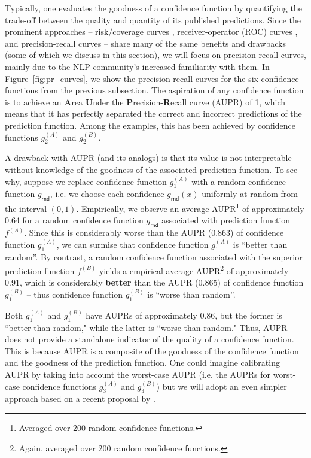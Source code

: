 \documentclass[11pt]{article}
\begin{document}
Typically, one evaluates the goodness of a confidence function by quantifying the trade-off between the quality and quantity of its published predictions. Since the prominent approaches -- risk/coverage curves \cite{el2010foundations}, receiver-operator (ROC) curves \cite{Davis06}, and precision-recall curves \cite{HendrycksG17} -- share many of the same benefits and drawbacks (some of which we discuss in this section), we will focus on precision-recall curves, mainly due to the NLP community's increased familiarity with them. In Figure~\ref{fig:pr_curves}, we show the precision-recall curves for the six confidence functions from the previous subsection. The aspiration of any confidence function is to achieve an \textbf{A}rea \textbf{U}nder the \textbf{P}recision-\textbf{R}ecall curve (AUPR) of 1, which means that it has perfectly separated the correct and incorrect predictions of the prediction function. Among the examples, this has been achieved by confidence functions $g_2^{(A)}$ and $g_2^{(B)}$.

A drawback with AUPR (and its analogs) is that its value is not interpretable without knowledge of the goodness of the associated prediction function. To see why, suppose we replace confidence function $g_1^{(A)}$ with a random confidence function $g_\mathsf{rnd}$, i.e. we choose each confidence $g_\mathsf{rnd}(x)$ uniformly at random from the interval $(0,1)$. Empirically, we observe an average AUPR\footnote{Averaged over 200 random confidence functions.} of approximately 0.64 for a random confidence function $g_\mathsf{rnd}$ associated with prediction function $f^{(A)}$. Since this is considerably worse than the AUPR (0.863) of confidence function $g_1^{(A)}$, we can surmise that confidence function $g_1^{(A)}$ is ``better than random''. By contrast, a random confidence function associated with the superior prediction function $f^{(B)}$ yields a empirical average AUPR\footnote{Again, averaged over 200 random confidence functions.} of approximately 0.91, which is considerably \textbf{better} than the AUPR (0.865) of confidence function $g_1^{(B)}$ -- thus confidence function $g_1^{(B)}$ is ``worse than random''.

Both $g_1^{(A)}$ and $g_1^{(B)}$ have AUPRs of approximately 0.86, but the former is ``better than random," while the latter is ``worse than random." Thus, AUPR does not provide a standalone indicator of the quality of a confidence function. This is because AUPR is a composite of the goodness of the confidence function and the goodness of the prediction function. One could imagine calibrating AUPR by taking into account the worst-case AUPR (i.e. the AUPRs for worst-case confidence functions $g_3^{(A)}$ and $g_3^{(B)}$) but we will adopt an even simpler approach based on a recent proposal by \cite{xin-etal-2021-art}.
\end{document}
